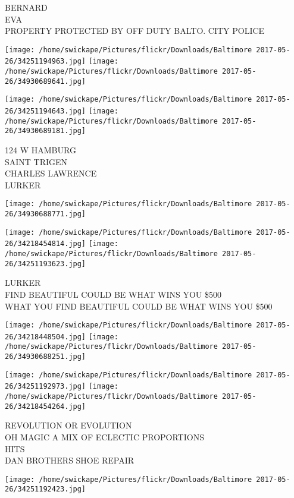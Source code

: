 \documentclass[10pt,letterpaper]{article}
\begin{document}
BERNARD\\
EVA\\
PROPERTY PROTECTED BY OFF DUTY BALTO. CITY POLICE
\pagebreak

\texttt{[image: /home/swickape/Pictures/flickr/Downloads/Baltimore 2017-05-26/34251194963.jpg]}
\texttt{[image: /home/swickape/Pictures/flickr/Downloads/Baltimore 2017-05-26/34930689641.jpg]}

\texttt{[image: /home/swickape/Pictures/flickr/Downloads/Baltimore 2017-05-26/34251194643.jpg]}
\texttt{[image: /home/swickape/Pictures/flickr/Downloads/Baltimore 2017-05-26/34930689181.jpg]}

124 W HAMBURG\\
SAINT TRIGEN\\
CHARLES LAWRENCE\\
LURKER
\pagebreak

\texttt{[image: /home/swickape/Pictures/flickr/Downloads/Baltimore 2017-05-26/34930688771.jpg]}

\vspace{0.25in}
\texttt{[image: /home/swickape/Pictures/flickr/Downloads/Baltimore 2017-05-26/34218454814.jpg]}
\texttt{[image: /home/swickape/Pictures/flickr/Downloads/Baltimore 2017-05-26/34251193623.jpg]}

LURKER\\
FIND BEAUTIFUL COULD BE WHAT WINS YOU \$500\\
WHAT YOU FIND BEAUTIFUL COULD BE WHAT WINS YOU \$500
\pagebreak

\texttt{[image: /home/swickape/Pictures/flickr/Downloads/Baltimore 2017-05-26/34218448504.jpg]}
\texttt{[image: /home/swickape/Pictures/flickr/Downloads/Baltimore 2017-05-26/34930688251.jpg]}

\texttt{[image: /home/swickape/Pictures/flickr/Downloads/Baltimore 2017-05-26/34251192973.jpg]}
\texttt{[image: /home/swickape/Pictures/flickr/Downloads/Baltimore 2017-05-26/34218454264.jpg]}

REVOLUTION OR EVOLUTION\\
OH MAGIC A MIX OF ECLECTIC PROPORTIONS\\
HITS\\
DAN BROTHERS SHOE REPAIR
\pagebreak

\texttt{[image: /home/swickape/Pictures/flickr/Downloads/Baltimore 2017-05-26/34251192423.jpg]}
\end{document}
